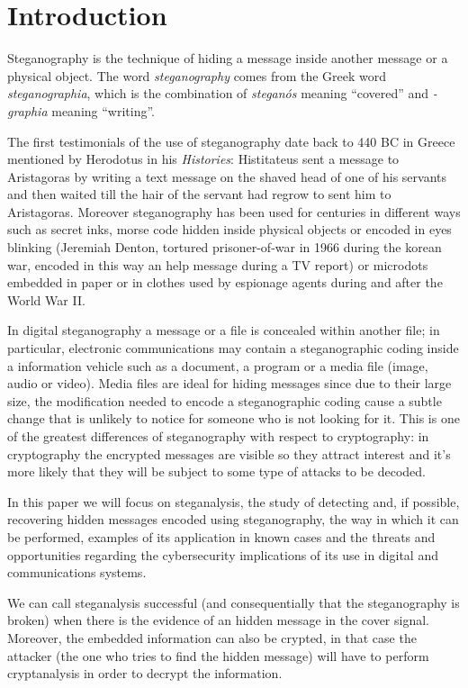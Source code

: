 \documentclass[../../main.tex]{subfiles}
\begin{document}
\section{Introduction}

Steganography is the technique of hiding a message inside another message or a
physical object.\cite{steganography-definition}
The word \textit{steganography} comes from the Greek word
\textit{steganographia}, which is the combination of \textit{steganós} meaning
``covered'' and \textit{-graphia} meaning ``writing''.

The first testimonials of the use of steganography date back to 440 BC in Greece
mentioned by Herodotus in his \emph{Histories}: Histitateus sent a message to
Aristagoras by writing a text message on the shaved head of one of his servants
and then waited till the hair of the servant had regrow to sent him to
Aristagoras.
Moreover steganography has been used for centuries in different ways such as
secret inks, morse code hidden inside physical objects or encoded in eyes
blinking (Jeremiah Denton, tortured prisoner-of-war in 1966 during the korean
war, encoded in this way an help message during a TV report) or microdots
embedded in paper or in clothes used by espionage agents during and after the
World War II.

In digital steganography a message or a file is concealed within another file;
in particular, electronic communications may contain a steganographic coding
inside a information vehicle such as a document, a program or a media file
(image, audio or video).
Media files are ideal for hiding messages since due to their large size, the
modification needed to encode a steganographic coding cause a subtle change that
is unlikely to notice for someone who is not looking for it.
This is one of the greatest differences of steganography with respect to
cryptography: in cryptography the encrypted messages are visible so they attract
interest and it's more likely that they will be subject to some type of attacks
to be decoded.

In this paper we will focus on steganalysis, the study of detecting and, if
possible, recovering hidden messages encoded using steganography, the way in
which it can be performed, examples of its application in known cases and
the threats and opportunities regarding the cybersecurity implications of its
use in digital and communications systems.

We can call steganalysis successful (and consequentially that the steganography
is broken) when there is the evidence of an hidden message in the cover signal.
Moreover, the embedded information can also be crypted, in that case the
attacker (the one who tries to find the hidden message) will have to perform
cryptanalysis in order to decrypt the information.

\pagebreak
\end{document}

